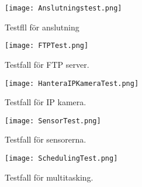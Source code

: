 \begin{figure}[h]
  \texttt{[image: Anslutningstest.png]}
  \caption{Testfll för anslutning}
  \label{fig:Anslutningstest}
\end{figure}

\begin{figure}[h]
  \texttt{[image: FTPTest.png]}
  \caption{Testfall för FTP server.}
  \label{fig:FTPTest}
\end{figure}

\begin{figure}[h]
  \texttt{[image: HanteraIPKameraTest.png]}
  \caption{Testfall för IP kamera.}
  \label{fig:HanteraIPKameraTest}
\end{figure}

\begin{figure}[h]
  \texttt{[image: SensorTest.png]}
  \caption{Testfall för sensorerna.}
  \label{fig:SensorTest}
\end{figure}

\begin{figure}[h]
  \texttt{[image: SchedulingTest.png]}
  \caption{Testfall för multitasking.}
  \label{fig:SchedulingTest}
\end{figure}




